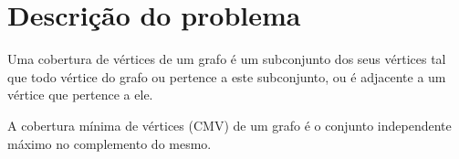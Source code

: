 \part{Descrição do problema}
\label{part:descricao}

Uma cobertura de vértices de um grafo é um subconjunto dos seus
vértices tal que todo vértice do grafo ou pertence a este subconjunto,
ou é adjacente a um vértice que pertence a ele.

A cobertura mínima de vértices (CMV) de um grafo é o conjunto independente
máximo no complemento do mesmo.







